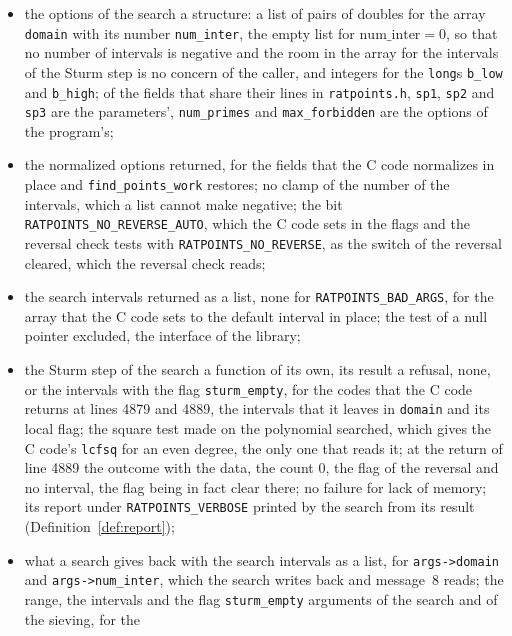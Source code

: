 \begin{itemize}
    intervals, the height bound and the largest denominator arguments of \verb|run_setup|, for the
    fields of the arguments that \verb|exact_bounds| reads;
  \item the options of the search a structure: a list of pairs of doubles for the array
    \verb|domain| with its number \verb|num_inter|, the empty list for $\mathrm{num\_inter} = 0$, so
    that no number of intervals is negative and the room in the array for the intervals of the Sturm
    step is no concern of the caller, and integers for the \verb|long|s \verb|b_low| and
    \verb|b_high|; of the fields that share their lines in \verb|ratpoints.h|, \verb|sp1|,
    \verb|sp2| and \verb|sp3| are the parameters', \verb|num_primes| and \verb|max_forbidden| are
    the options of the program's;
  \item the normalized options returned, for the fields that the C code normalizes in place and
    \verb|find_points_work| restores; no clamp of the number of the intervals, which a list cannot
    make negative; the bit \verb|RATPOINTS_NO_REVERSE_AUTO|, which the C code sets in the flags and
    the reversal check tests with \verb|RATPOINTS_NO_REVERSE|, as the switch of the reversal
    cleared, which the reversal check reads;
  \item the search intervals returned as a list, none for \verb|RATPOINTS_BAD_ARGS|, for the array
    that the C code sets to the default interval in place; the test of a null pointer excluded, the
    interface of the library;
  \item the Sturm step of the search a function of its own, its result a refusal, none, or the
    intervals with the flag \verb|sturm_empty|, for the codes that the C code returns at lines 4879
    and 4889, the intervals that it leaves in \verb|domain| and its local flag; the square test made
    on the polynomial searched, which gives the C code's \verb|lcfsq| for an even degree, the only
    one that reads it; at the return of line 4889 the outcome with the data, the count $0$, the flag
    of the reversal and no interval, the flag being in fact clear there; no failure for lack of
    memory; its report under \verb|RATPOINTS_VERBOSE| printed by the search from its result
    (Definition~\ref{def:report});
  \item what a search gives back with the search intervals as a list, for \verb|args->domain| and
    \verb|args->num_inter|, which the search writes back and message~8 reads; the range, the
    intervals and the flag \verb|sturm_empty| arguments of the search and of the sieving, for the

\end{itemize}
